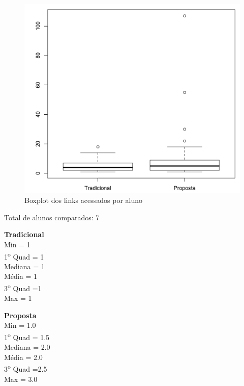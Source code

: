 \begin{figure}[htb]
  \caption{\label{fig:uso-sr-boxplot}Boxplot dos links acessados por aluno}
  \begin{center}
      \includegraphics[scale=0.4]{./Figuras/uso-sr-boxplot.png}
  \end{center}
\end{figure}

\noindent
Total de alunos comparados: 7

\begin{multicols}{2}

\noindent\textbf{Tradicional}\\
Min = 1\\
1\textsuperscript{o} Quad = 1\\
Mediana = 1\\
Média = 1\\
3\textsuperscript{o} Quad =1\\
Max = 1\\

\columnbreak

\noindent\textbf{Proposta}\\
Min = 1.0\\
1\textsuperscript{o} Quad = 1.5\\
Mediana = 2.0\\
Média = 2.0\\
3\textsuperscript{o} Quad =2.5\\
Max = 3.0
\end{multicols}

